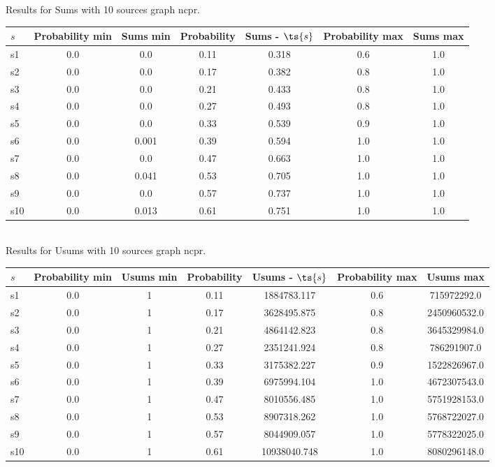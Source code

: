 \documentclass{article}
\begin{document}
\noindent Results for Sums with 10 sources graph ncpr.

\noindent\begin{tabular}{|l|c|c|c|c|c|c|}
\hline
$s$& Probability min & Sums min & Probability & Sums - $\ts{s}$ & Probability max & Sums max\\
\hline
s1 &0.0 & 0.0 & 0.11 & 0.318 & 0.6 & 1.0\\
\hline
s2 &0.0 & 0.0 & 0.17 & 0.382 & 0.8 & 1.0\\
\hline
s3 &0.0 & 0.0 & 0.21 & 0.433 & 0.8 & 1.0\\
\hline
s4 &0.0 & 0.0 & 0.27 & 0.493 & 0.8 & 1.0\\
\hline
s5 &0.0 & 0.0 & 0.33 & 0.539 & 0.9 & 1.0\\
\hline
s6 &0.0 & 0.001 & 0.39 & 0.594 & 1.0 & 1.0\\
\hline
s7 &0.0 & 0.0 & 0.47 & 0.663 & 1.0 & 1.0\\
\hline
s8 &0.0 & 0.041 & 0.53 & 0.705 & 1.0 & 1.0\\
\hline
s9 &0.0 & 0.0 & 0.57 & 0.737 & 1.0 & 1.0\\
\hline
s10 &0.0 & 0.013 & 0.61 & 0.751 & 1.0 & 1.0\\
\hline
\end{tabular}\\

\noindent Results for Usums with 10 sources graph ncpr.

\noindent\begin{tabular}{|l|c|c|c|c|c|c|}
\hline
$s$& Probability min & Usums min & Probability & Usums - $\ts{s}$ & Probability max & Usums max\\
\hline
s1 &0.0 & 1 & 0.11 & 1884783.117 & 0.6 & 715972292.0\\
\hline
s2 &0.0 & 1 & 0.17 & 3628495.875 & 0.8 & 2450960532.0\\
\hline
s3 &0.0 & 1 & 0.21 & 4864142.823 & 0.8 & 3645329984.0\\
\hline
s4 &0.0 & 1 & 0.27 & 2351241.924 & 0.8 & 786291907.0\\
\hline
s5 &0.0 & 1 & 0.33 & 3175382.227 & 0.9 & 1522826967.0\\
\hline
s6 &0.0 & 1 & 0.39 & 6975994.104 & 1.0 & 4672307543.0\\
\hline
s7 &0.0 & 1 & 0.47 & 8010556.485 & 1.0 & 5751928153.0\\
\hline
s8 &0.0 & 1 & 0.53 & 8907318.262 & 1.0 & 5768722027.0\\
\hline
s9 &0.0 & 1 & 0.57 & 8044909.057 & 1.0 & 5778322025.0\\
\hline
s10 &0.0 & 1 & 0.61 & 10938040.748 & 1.0 & 8080296148.0\\
\hline
\end{tabular}\\
\end{document}
